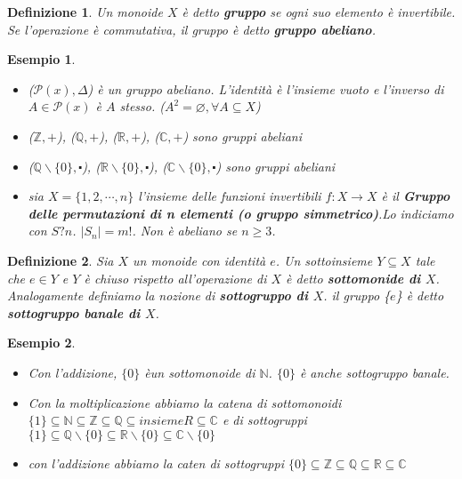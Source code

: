 \documentclass[a4paper,12pt]{article}
\theoremstyle{def}
\newtheorem*{definition}{Definizione}
\theoremstyle{prop}
\theoremstyle{esempio}
\newtheorem*{example}{Esempio}
\theoremstyle{dimostrazione}
\theoremstyle{teo}
\theoremstyle{osservazione}
\begin{document}
\begin{definition}
    Un monoide \(X\) è detto \textbf{gruppo} se ogni suo elemento è invertibile. Se l'operazione è
    commutativa, il gruppo è detto \textbf{gruppo abeliano}.
\end{definition}

\begin{example}
    \
    \begin{itemize}
        \item (\(\mathcal{P}(x) ,\Delta \)) è un gruppo abeliano. L'identità è l'insieme vuoto e l'inverso
              di \(A \in \mathcal{P}(x)\) è \(A\) stesso. (\(A^2 = \varnothing,  \forall A \subseteq X \))
        \item (\(\mathbb{Z},+\)), (\(\mathbb{Q},+\)), (\(\mathbb{R},+\)), (\(\mathbb{C},+\)) sono gruppi abeliani
        \item (\(\mathbb{Q}\backslash \{0\}, \centerdot\)), (\(\mathbb{R}\backslash \{0\}, \centerdot\)),
              (\(\mathbb{C}\backslash \{0\}, \centerdot\)) sono gruppi abeliani
        \item sia \(X= \{1,2,\cdots,n\}\) l'insieme delle funzioni invertibili \(f:X \rightarrow X\) è il
              \textbf{Gruppo delle permutazioni di n elementi (o gruppo simmetrico)}.Lo indiciamo con \(S?n\).
              \(|S_n| = m!\). Non è abeliano se \(n \geq 3\).
    \end{itemize}
\end{example}

\begin{definition}
    Sia \(X\) un monoide con identità \(e\). Un sottoinsieme \(Y \subseteq X\) tale che \(e \in Y\) e \(Y\)
    è chiuso rispetto all'operazione di \(X\) è detto \textbf{sottomonide di \(X\)}. Analogamente definiamo
    la nozione di \textbf{sottogruppo di \(X\)}. il gruppo \{\(e\)\} è detto \textbf{sottogruppo banale di \(X\)}.
\end{definition}

\begin{example}
    \
    \begin{itemize}
        \item Con l'addizione, \(\{0\}\) èun sottomonoide di \(\mathbb{N}\). \(\{0\}\) è anche sottogruppo banale.
        \item Con la moltiplicazione abbiamo la catena di sottomonoidi \(\{1\} \subseteq \mathbb{N} \subseteq
              \mathbb{Z} \subseteq \mathbb{Q} \subseteq insieme R \subseteq  \mathbb{C}\) e di sottogruppi \(\{1\}
              \subseteq \mathbb{Q}\backslash \{0\} \subseteq \mathbb{R} \backslash \{0\} \subseteq \mathbb{C}
              \backslash \{0\}\)
        \item con l'addizione abbiamo la caten di sottogruppi \(\{0\} \subseteq \mathbb{Z} \subseteq \mathbb{Q}
              \subseteq \mathbb{R} \subseteq \mathbb{C}\)
    \end{itemize}
\end{example}
\end{document}
